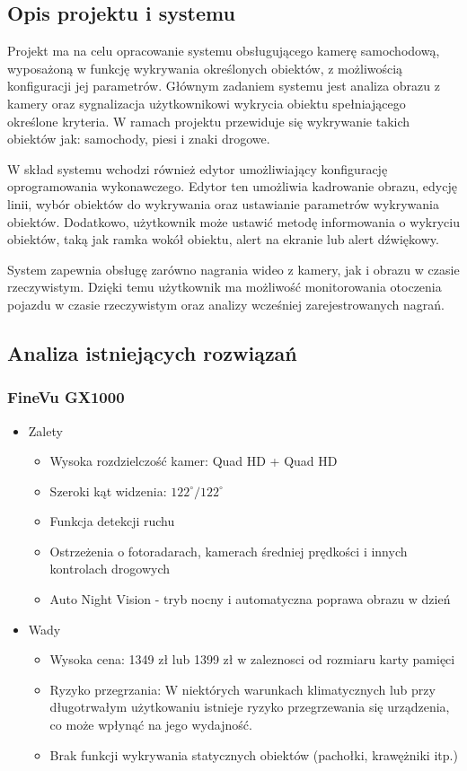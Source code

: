 \subsection{Opis projektu i systemu}
Projekt ma na celu opracowanie systemu obsługującego kamerę samochodową, wyposażoną
w funkcję wykrywania określonych obiektów, z możliwością konfiguracji jej parametrów.
Głównym zadaniem systemu jest analiza obrazu z kamery oraz sygnalizacja użytkownikowi wykrycia
obiektu spełniającego określone kryteria.
W ramach projektu przewiduje się wykrywanie takich obiektów jak: samochody, piesi i znaki drogowe.

W skład systemu wchodzi również edytor umożliwiający konfigurację oprogramowania wykonawczego.
Edytor ten umożliwia kadrowanie obrazu, edycję linii, wybór obiektów do wykrywania oraz ustawianie
parametrów wykrywania obiektów. Dodatkowo, użytkownik może ustawić metodę informowania o wykryciu obiektów,
taką jak ramka wokół obiektu, alert na ekranie lub alert dźwiękowy.

System zapewnia obsługę zarówno nagrania wideo z kamery, jak i obrazu w czasie rzeczywistym.
Dzięki temu użytkownik ma możliwość monitorowania otoczenia pojazdu w czasie rzeczywistym oraz analizy
wcześniej zarejestrowanych nagrań.

\subsection{Analiza istniejących rozwiązań}
\subsubsection*{FineVu GX1000}
\begin{itemize}
    \item Zalety
          \begin{itemize}
              \item Wysoka rozdzielczość kamer: Quad HD + Quad HD
              \item Szeroki kąt widzenia: $122^\circ / 122^\circ$
              \item Funkcja detekcji ruchu
              \item Ostrzeżenia o fotoradarach, kamerach średniej prędkości i innych kontrolach drogowych
              \item Auto Night Vision - tryb nocny i automatyczna poprawa obrazu w dzień
          \end{itemize}
    \item Wady
          \begin{itemize}
              \item Wysoka cena: 1349 zł lub 1399 zł w zaleznosci od rozmiaru karty pamięci
              \item Ryzyko przegrzania: W niektórych warunkach klimatycznych lub przy długotrwałym
                    użytkowaniu istnieje ryzyko przegrzewania się urządzenia, co może wpłynąć na jego wydajność.
              \item Brak funkcji wykrywania statycznych obiektów (pachołki, krawężniki itp.)
          \end{itemize}
\end{itemize}

